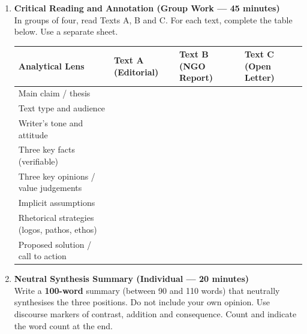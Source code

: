 \documentclass[11pt]{article}
\begin{document}
\begin{enumerate}
    \item \textbf{Critical Reading and Annotation (Group Work --- 45 minutes)} \\
    In groups of four, read Texts A, B and C. For each text, complete the table below. Use a separate sheet.
    \begin{center}
    \begin{tabularx}{\linewidth}{|l|X|X|X|}\hline
    \rowcolor{popblueL}
    \textbf{Analytical Lens} & \textbf{Text A (Editorial)} & \textbf{Text B (NGO Report)} & \textbf{Text C (Open Letter)} \\ \hline
    Main claim / thesis & & & \\ \hline
    Text type and audience & & & \\ \hline
    Writer's tone and attitude & & & \\ \hline
    Three key facts (verifiable) & & & \\ \hline
    Three key opinions / value judgements & & & \\ \hline
    Implicit assumptions & & & \\ \hline
    Rhetorical strategies (logos, pathos, ethos) & & & \\ \hline
    Proposed solution / call to action & & & \\ \hline
    \end{tabularx}
    \end{center}

    \item \textbf{Neutral Synthesis Summary (Individual --- 20 minutes)} \\
    Write a \textbf{100-word} summary (between 90 and 110 words) that neutrally synthesises the three positions. Do not include your own opinion. Use discourse markers of contrast, addition and consequence. Count and indicate the word count at the end.


\end{enumerate}
\end{document}
